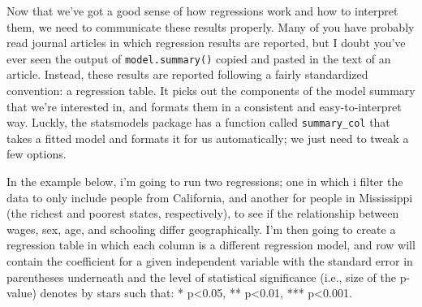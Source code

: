 \documentclass[
  letterpaper,
  DIV=11,
  numbers=noendperiod]{scrreprt}
\begin{document}
Now that we've got a good sense of how regressions work and how to
interpret them, we need to communicate these results properly. Many of
you have probably read journal articles in which regression results are
reported, but I doubt you've ever seen the output of
\texttt{model.summary()} copied and pasted in the text of an article.
Instead, these results are reported following a fairly standardized
convention: a regression table. It picks out the components of the model
summary that we're interested in, and formats them in a consistent and
easy-to-interpret way. Luckly, the statsmodels package has a function
called \texttt{summary\_col} that takes a fitted model and formats it
for us automatically; we just need to tweak a few options.

In the example below, i'm going to run two regressions; one in which i
filter the data to only include people from California, and another for
people in Mississippi (the richest and poorest states, respectively), to
see if the relationship between wages, sex, age, and schooling differ
geographically. I'm then going to create a regression table in which
each column is a different regression model, and row will contain the
coefficient for a given independent variable with the standard error in
parentheses underneath and the level of statistical significance (i.e.,
size of the p-value) denotes by stars such that: * p\textless0.05, **
p\textless0.01, *** p\textless0.001.
\end{document}
